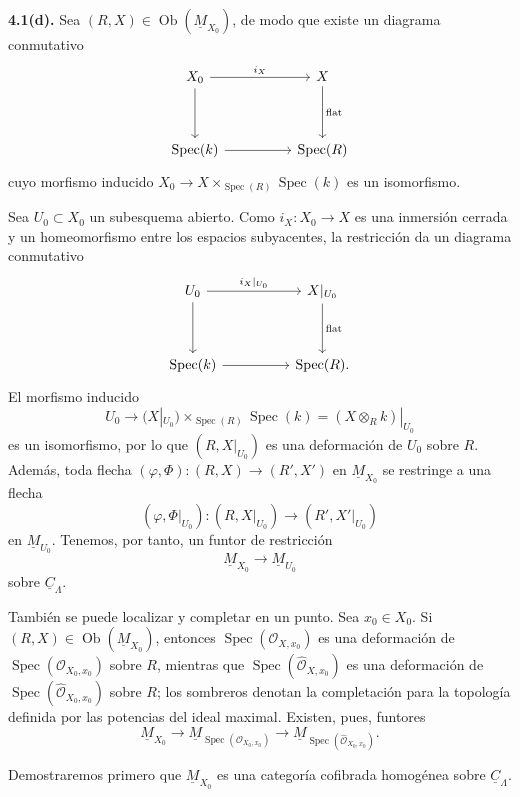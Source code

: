 \medskip
\noindent\textbf{4.1(d).}
Sea $(R,X)\in\operatorname{Ob}(\underline M_{X_0})$, de modo que
existe un diagrama conmutativo
\[
\begin{tikzcd}[column sep=huge,row sep=huge]
X_0 \arrow[r,"i_X"] \arrow[d] & X \arrow[d,"\mathrm{flat}"] \\
\operatorname{Spec}(k) \arrow[r] & \operatorname{Spec}(R)
\end{tikzcd}
\]
cuyo morfismo inducido
$X_0\longrightarrow X\times_{\operatorname{Spec}(R)}
\operatorname{Spec}(k)$ es un isomorfismo.


Sea $U_0\subset X_0$ un subesquema abierto. Como
$i_X:X_0\longrightarrow X$ es una inmersión cerrada y un
homeomorfismo entre los espacios subyacentes, la restricción da un
diagrama conmutativo
\[
\begin{tikzcd}[column sep=huge,row sep=huge]
U_0 \arrow[r,"i_X|_{U_0}"] \arrow[d]
& X|_{U_0} \arrow[d,"\mathrm{flat}"] \\
\operatorname{Spec}(k) \arrow[r] & \operatorname{Spec}(R).
\end{tikzcd}
\]
El morfismo inducido
\[
 U_0\longrightarrow
 (X|_{U_0})\times_{\operatorname{Spec}(R)}\operatorname{Spec}(k)
 =(X\otimes_Rk)|_{U_0}
\]
es un isomorfismo, por lo que $(R,X|_{U_0})$ es una deformación de
$U_0$ sobre $R$. Además, toda flecha
$(\varphi,\Phi):(R,X)\longrightarrow(R',X')$ en
$\underline M_{X_0}$ se restringe a una flecha
\[
 (\varphi,\Phi|_{U_0}):(R,X|_{U_0})
 \longrightarrow(R',X'|_{U_0})
\]
en $\underline M_{U_0}$. Tenemos, por tanto, un funtor de restricción
\[
 \underline M_{X_0}\longrightarrow\underline M_{U_0}
\]
sobre $\underline C_\Lambda$.

También se puede localizar y completar en un punto. Sea
$x_0\in X_0$. Si $(R,X)\in\operatorname{Ob}(\underline M_{X_0})$,
entonces $\operatorname{Spec}(\mathcal O_{X,x_0})$ es una deformación
de $\operatorname{Spec}(\mathcal O_{X_0,x_0})$ sobre $R$, mientras
que $\operatorname{Spec}(\widehat{\mathcal O}_{X,x_0})$ es una
deformación de
$\operatorname{Spec}(\widehat{\mathcal O}_{X_0,x_0})$ sobre $R$; los
sombreros denotan la completación para la topología definida por las
potencias del ideal maximal. Existen, pues, funtores
\[
 \underline M_{X_0}
 \longrightarrow
 \underline M_{\operatorname{Spec}(\mathcal O_{X_0,x_0})}
 \longrightarrow
 \underline M_{\operatorname{Spec}(\widehat{\mathcal O}_{X_0,x_0})}.
\]

Demostraremos primero que $\underline M_{X_0}$ es una categoría
cofibrada homogénea sobre $\underline C_\Lambda$.
